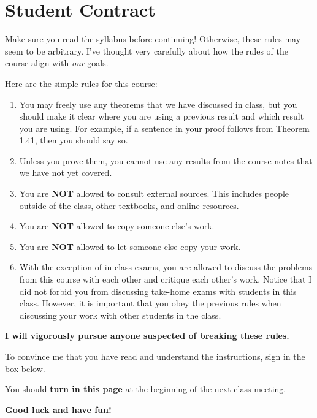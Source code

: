 \documentclass[11pt]{article}
\begin{document}
\section*{Student Contract}

Make sure you read the syllabus before continuing!  Otherwise, these rules may seem to be arbitrary.  I've thought very carefully about how the rules of the course align with \emph{our} goals.

\bigskip

\noindent Here are the simple rules for this course:

\begin{enumerate}
\item You may freely use any theorems that we have discussed in class, but you should make it clear where you are using a previous result and which result you are using.  For example, if a sentence in your proof follows from Theorem 1.41, then you should say so.
\item Unless you prove them, you cannot use any results from the course notes that we have not yet covered.
\item You are \textbf{NOT} allowed to consult external sources.  This includes people outside of the class, other textbooks, and online resources.
\item You are \textbf{NOT} allowed to copy someone else's work.
\item You are \textbf{NOT} allowed to let someone else copy your work.
\item With the exception of in-class exams, you are allowed to discuss the problems from this course with each other and critique each other's work.  Notice that I did not forbid you from discussing take-home exams with students in this class.  However, it is important that you obey the previous rules when discussing your work with other students in the class.
\end{enumerate}

\begin{center}
\textbf{I will vigorously pursue anyone suspected of breaking these rules.}
\end{center}

\bigskip

\noindent To convince me that you have read and understand the instructions, sign in the box below.

\bigskip


\bigskip

\noindent You should \textbf{turn in this page} at the beginning of the next class meeting.

\bigskip

\centerline{\textbf{Good luck and have fun!}}
\end{document}
